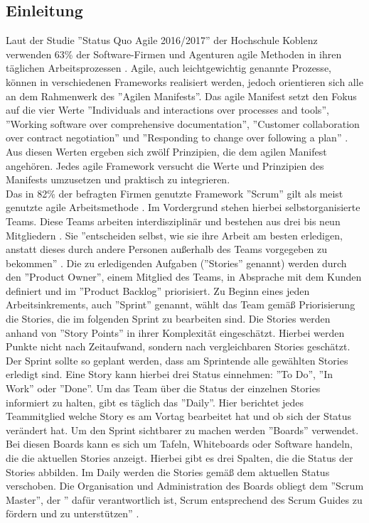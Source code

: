 \documentclass[12pt,titlepage]{scrartcl}
\begin{document}
		\subsection{Einleitung}
		Laut der Studie ''Status Quo Agile 2016/2017'' der Hochschule Koblenz verwenden 63\% der 				Software-Firmen und Agenturen agile Methoden in ihren täglichen Arbeitsprozessen 						\cite{hskob}. 
		Agile, auch leichtgewichtig genannte Prozesse, können in verschiedenen Frameworks realisiert 			werden, jedoch orientieren sich alle an dem Rahmenwerk des ''Agilen Manifests''. Das agile 				Manifest setzt den Fokus auf die vier Werte ''Individuals and interactions over processes and 		tools'', ''Working software over comprehensive documentation'', ''Customer collaboration over 		contract negotiation'' und ''Responding to change over following a plan'' \cite{manifest}. 				Aus diesen Werten 			ergeben sich zwölf Prinzipien, die dem agilen Manifest angehören. 		Jedes agile Framework 				versucht die Werte und Prinzipien des Manifests 					umzusetzen und praktisch zu integrieren. \\
		Das in 82\% der befragten Firmen genutzte Framework ''Scrum'' gilt als meist genutzte agile 			Arbeitsmethode \cite{hskob}. Im Vordergrund stehen hierbei selbstorganisierte Teams. Diese 				Teams arbeiten interdisziplinär und bestehen aus drei bis neun Mitgliedern \cite{guide}. Sie 			''entscheiden selbst, wie sie ihre Arbeit am besten erledigen, anstatt dieses durch andere
		Personen außerhalb des Teams vorgegeben zu bekommen'' \cite{guide}. Die zu erledigenden 				Aufgaben (''Stories'' genannt) werden durch den ''Product Owner'', einem Mitglied des Teams, 			in Absprache mit dem Kunden definiert und im ''Product Backlog'' priorisiert. Zu Beginn eines 		jeden Arbeitsinkrements, auch ''Sprint'' genannt, wählt das Team gemäß Priorisierung die 				Stories, die 		im folgenden Sprint zu bearbeiten sind. Die Stories werden anhand von 				''Story Points'' in ihrer Komplexität eingeschätzt. Hierbei werden Punkte nicht nach 					Zeitaufwand, sondern nach vergleichbaren Stories geschätzt. Der Sprint sollte so geplant 				werden, dass am Sprintende alle gewählten Stories erledigt sind. Eine Story kann hierbei drei 		Status einnehmen: ''To Do'', ''In Work'' oder ''Done''. Um das Team über die Status der 				einzelnen Stories informiert zu halten, gibt es täglich das ''Daily''. Hier berichtet jedes 			Teammitglied welche Story es am Vortag bearbeitet hat und ob sich der Status verändert hat. 			Um den Sprint sichtbarer zu machen werden ''Boards'' verwendet. Bei diesen Boards kann es 				sich um Tafeln, Whiteboards oder Software handeln, die die aktuellen Stories anzeigt. Hierbei 		gibt es drei Spalten, die die Status der Stories abbilden. Im Daily werden die Stories gemäß 			dem aktuellen Status verschoben. Die Organisation und Administration des Boards obliegt dem 			''Scrum Master'', der '' dafür verantwortlich ist, Scrum entsprechend des Scrum Guides zu 				fördern	und zu unterstützen'' \cite{guide}.
\end{document}
